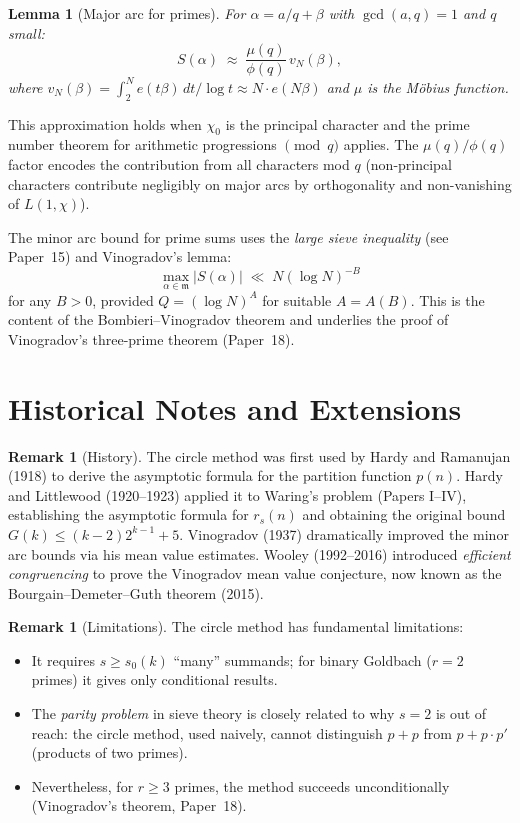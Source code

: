 \documentclass[12pt,a4paper]{amsart}
\newtheorem{lemma}[theorem]{Lemma}
\theoremstyle{definition}
\newtheorem{remark}[theorem]{Remark}
\newcommand{\eq}[1]{e\!\left(#1\right)}
\begin{document}
\begin{lemma}[Major arc for primes]\label{lem:major_prime}
  For $\alpha = a/q + \beta$ with $\gcd(a, q) = 1$ and $q$ small:
  \[
    S(\alpha) \;\approx\; \frac{\mu(q)}{\phi(q)}\, v_N(\beta),
  \]
  where $v_N(\beta) = \int_2^N \eq{t\beta}\, dt / \log t \approx N\cdot \eq{N\beta}$
  and $\mu$ is the M\"obius function.
\end{lemma}

This approximation holds when $\chi_0$ is the principal character and
the prime number theorem for arithmetic progressions $\pmod{q}$ applies.
The $\mu(q)/\phi(q)$ factor encodes the contribution from all characters
mod $q$ (non-principal characters contribute negligibly on major arcs by
orthogonality and non-vanishing of $L(1,\chi)$).

The minor arc bound for prime sums uses the \emph{large sieve inequality}
(see Paper~15) and Vinogradov's lemma:
\[
  \max_{\alpha \in \mathfrak{m}} |S(\alpha)| \;\ll\; N(\log N)^{-B}
\]
for any $B > 0$, provided $Q = (\log N)^A$ for suitable $A = A(B)$.
This is the content of the Bombieri--Vinogradov theorem and underlies
the proof of Vinogradov's three-prime theorem (Paper~18).

\section{Historical Notes and Extensions}
\label{sec:history}

\begin{remark}[History]
  The circle method was first used by Hardy and Ramanujan (1918) to derive
  the asymptotic formula for the partition function $p(n)$.  Hardy and
  Littlewood (1920--1923) applied it to Waring's problem (Papers I--IV),
  establishing the asymptotic formula for $r_s(n)$ and obtaining the
  original bound $G(k) \leq (k-2)2^{k-1} + 5$.  Vinogradov (1937)
  dramatically improved the minor arc bounds via his mean value estimates.
  Wooley (1992--2016) introduced \emph{efficient congruencing} to prove
  the Vinogradov mean value conjecture, now known as the Bourgain--Demeter--Guth
  theorem (2015).
\end{remark}

\begin{remark}[Limitations]
  The circle method has fundamental limitations:
  \begin{itemize}
    \item It requires $s \geq s_0(k)$ ``many'' summands; for binary Goldbach
      ($r = 2$ primes) it gives only conditional results.
    \item The \emph{parity problem} in sieve theory is closely related to why
      $s = 2$ is out of reach: the circle method, used naively, cannot
      distinguish $p + p$ from $p + p \cdot p'$ (products of two primes).
    \item Nevertheless, for $r \geq 3$ primes, the method succeeds
      unconditionally (Vinogradov's theorem, Paper~18).
  \end{itemize}
\end{remark}
\end{document}
